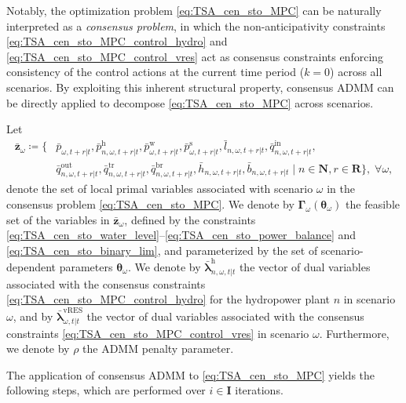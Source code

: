 \documentclass[a4paper,fleqn]{cas-sc}
\begin{document}
Notably, the optimization problem \eqref{eq:TSA_cen_sto_MPC} can be naturally interpreted as a \textit{consensus problem},
in which the non-anticipativity constraints \eqref{eq:TSA_cen_sto_MPC_control_hydro} and \eqref{eq:TSA_cen_sto_MPC_control_vres}
act as consensus constraints enforcing consistency of the control actions at the current time period ($k = 0$) across all scenarios.
By exploiting this inherent structural property, consensus ADMM \citep{boyd2010distributed} can be directly applied to decompose \eqref{eq:TSA_cen_sto_MPC} across scenarios.

Let
\begin{equation}
\begin{aligned}
\boldsymbol{\bar{z}}_{\omega} \coloneqq \Big\{
& \bar{p}_{\omega,t+r|t},
\bar{p}^{\mathrm{h}}_{n,\omega,t+r|t},
\bar{p}^{\mathrm{w}}_{\omega,t+r|t},
\bar{p}^{\mathrm{s}}_{\omega,t+r|t},
\bar{l}_{n,\omega,t+r|t},
\bar{q}^{\mathrm{in}}_{n,\omega,t+r|t}, \\
& \bar{q}^{\mathrm{out}}_{n,\omega,t+r|t},
\bar{q}^{\mathrm{tr}}_{n,\omega,t+r|t},
\bar{q}^{\mathrm{br}}_{n,\omega,t+r|t},
\bar{h}_{n,\omega,t+r|t},
\bar{b}_{n,\omega,t+r|t}
\;\Big|\;
n \in \boldsymbol{N},
r \in \boldsymbol{R}
\Big\}, \; \forall \omega,
\end{aligned}
\end{equation}
denote the set of local primal variables associated with scenario $\omega$ in the consensus problem \eqref{eq:TSA_cen_sto_MPC}.
We denote by $\boldsymbol{\Gamma}_\omega(\boldsymbol{\theta}_\omega)$ the feasible set of the variables in $\boldsymbol{\bar{z}}_{\omega}$, defined by the constraints \eqref{eq:TSA_cen_sto_water_level}--\eqref{eq:TSA_cen_sto_power_balance} and \eqref{eq:TSA_cen_sto_binary_lim}, and parameterized by the set of scenario-dependent parameters $\boldsymbol{\theta}_\omega$.
We denote by
$\boldsymbol{\bar{\lambda}}^{\boldsymbol{\mathrm{h}}}_{n,\omega,t|t}$
the vector of dual variables associated with the consensus constraints
\eqref{eq:TSA_cen_sto_MPC_control_hydro} for the hydropower plant $n$ in scenario $\omega$,
and by
$\boldsymbol{\bar{\lambda}}^{\boldsymbol{\mathrm{vRES}}}_{\omega,t|t}$
the vector of dual variables associated with the consensus constraints
\eqref{eq:TSA_cen_sto_MPC_control_vres} in scenario $\omega$.
Furthermore, we denote by $\rho$ the ADMM penalty parameter.

The application of consensus ADMM to \eqref{eq:TSA_cen_sto_MPC} yields the following steps, which are performed over $i \in \boldsymbol{I}$ iterations.
\end{document}
